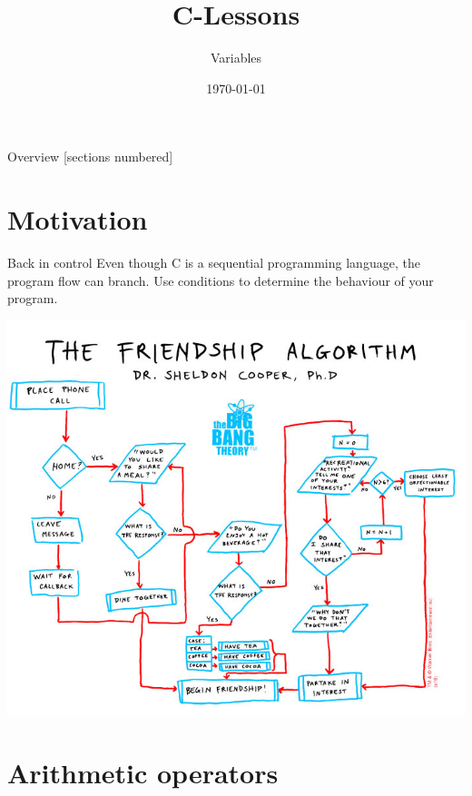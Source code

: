 


\title{C-Lessons}
\subtitle{Variables}
\date{\today}



\begin{frame}
	\titlepage
\end{frame}
\begin{frame}{Overview}
	[sections numbered]
	\tableofcontents
\end{frame}

\section{Motivation}

\begin{frame}{Back in control}
	Even though C is a sequential programming language, the program flow can branch.
	Use conditions to determine the behaviour of your program.
	\centerline{\includegraphics[scale=.27]{../img/friendship.jpg}}
\end{frame}

\section{Arithmetic operators}


